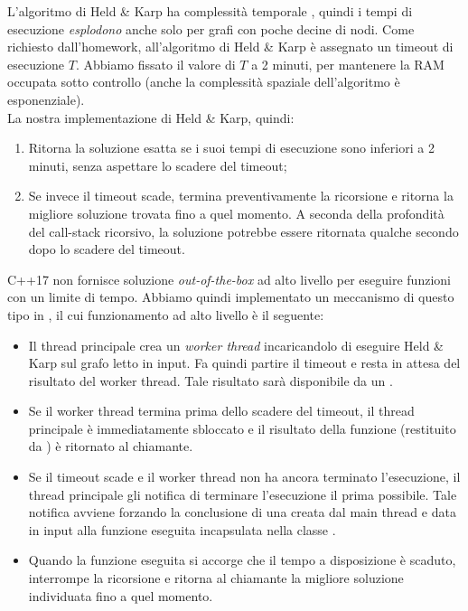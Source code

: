 \noindent L'algoritmo di Held \& Karp ha complessità temporale \complexityHeldKarpTime{}, quindi i tempi di esecuzione \textit{esplodono} anche solo per grafi con poche decine di nodi. Come richiesto dall'homework, all'algoritmo di Held \& Karp è assegnato un timeout di esecuzione $T$. Abbiamo fissato il valore di $T$ a 2 minuti, per mantenere la RAM occupata sotto controllo (anche la complessità spaziale dell'algoritmo è esponenziale).\\

\noindent La nostra implementazione di Held \& Karp, quindi:

\begin{enumerate}
    \item Ritorna la soluzione esatta se i suoi tempi di esecuzione sono inferiori a 2 minuti, senza aspettare lo scadere del timeout;
    \item Se invece il timeout scade, termina preventivamente la ricorsione e ritorna la migliore soluzione trovata fino a quel momento. A seconda della profondità del call-stack ricorsivo, la soluzione potrebbe essere ritornata qualche secondo dopo lo scadere del timeout.
\end{enumerate}

\noindent C++17 non fornisce soluzione \textit{out-of-the-box} ad alto livello per eseguire funzioni con un limite di tempo. Abbiamo quindi implementato un meccanismo di questo tipo in , il cui funzionamento ad alto livello è il seguente:

\begin{itemize}
    \item Il thread principale crea un \textit{worker thread} incaricandolo di eseguire Held \& Karp sul grafo letto in input. Fa quindi partire il timeout e resta in attesa del risultato del worker thread. Tale risultato sarà disponibile da un .
    \item Se il worker thread termina prima dello scadere del timeout, il thread principale è immediatamente sbloccato e il risultato della funzione (restituito da ) è ritornato al chiamante.
    \item Se il timeout scade e il worker thread non ha ancora terminato l'esecuzione, il thread principale gli notifica di terminare l'esecuzione il prima possibile. Tale notifica avviene forzando la conclusione di una  creata dal main thread e data in input alla funzione eseguita incapsulata nella classe .
    \item Quando la funzione eseguita si accorge che il tempo a disposizione è scaduto, interrompe la ricorsione e ritorna al chiamante la migliore soluzione individuata fino a quel momento.
\end{itemize}

